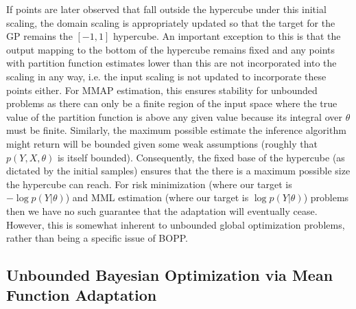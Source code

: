 If points are later observed that fall outside the hypercube under this initial scaling, the domain scaling 
is appropriately updated so that the target for the GP remains the $[-1,1]$ hypercube.  
An important exception to this is that the output mapping to the bottom of the hypercube remains 
fixed and any points with partition function estimates lower than this are not incorporated into the scaling in any way,
i.e. the input scaling is not updated to incorporate these points either.
For MMAP estimation, this ensures stability for unbounded problems as there can only be a finite region
of the input space where the true value of the partition function is above any given value because its integral
over $\theta$ must be finite.  Similarly, the
maximum possible estimate the inference algorithm might return will be bounded
given some weak assumptions (roughly that $p(Y,X,\theta)$ is itself bounded).
Consequently, the fixed base of the hypercube (as dictated by the initial samples) ensures that the 
there is a maximum possible size the hypercube can reach.
For risk minimization (where our target is $-\log p(Y|\theta)$) and  MML estimation
(where our target is $\log p(Y|\theta)$) problems then we have no such guarantee that the adaptation will 
eventually cease.  However, this is somewhat inherent to unbounded global optimization problems,
rather than being a specific issue of BOPP.

\subsection{Unbounded Bayesian Optimization via Mean Function Adaptation}
\label{sec:bopp:unbounded}


